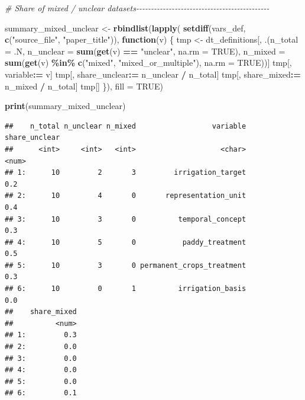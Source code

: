\documentclass[
  11pt,
]{article}
\newenvironment{Shaded}{\begin{snugshade}}{\end{snugshade}}
\newcommand{\AttributeTok}[1]{\textcolor[rgb]{0.13,0.29,0.53}{#1}}
\newcommand{\CommentTok}[1]{\textcolor[rgb]{0.56,0.35,0.01}{\textit{#1}}}
\newcommand{\ConstantTok}[1]{\textcolor[rgb]{0.56,0.35,0.01}{#1}}
\newcommand{\ControlFlowTok}[1]{\textcolor[rgb]{0.13,0.29,0.53}{\textbf{#1}}}
\newcommand{\FunctionTok}[1]{\textcolor[rgb]{0.13,0.29,0.53}{\textbf{#1}}}
\newcommand{\NormalTok}[1]{#1}
\newcommand{\OtherTok}[1]{\textcolor[rgb]{0.56,0.35,0.01}{#1}}
\newcommand{\SpecialCharTok}[1]{\textcolor[rgb]{0.81,0.36,0.00}{\textbf{#1}}}
\newcommand{\StringTok}[1]{\textcolor[rgb]{0.31,0.60,0.02}{#1}}
\begin{document}
\begin{Shaded}
\begin{Highlighting}[]
\CommentTok{\# Share of mixed / unclear datasets{-}{-}{-}{-}{-}{-}{-}{-}{-}{-}{-}{-}{-}{-}{-}{-}{-}{-}{-}{-}{-}{-}{-}{-}{-}{-}{-}{-}{-}{-}{-}{-}{-}{-}{-}{-}{-}{-}{-}{-}{-}{-}{-}{-}{-}}

\NormalTok{summary\_mixed\_unclear }\OtherTok{\textless{}{-}} \FunctionTok{rbindlist}\NormalTok{(}\FunctionTok{lapply}\NormalTok{(}
  \FunctionTok{setdiff}\NormalTok{(vars\_def, }\FunctionTok{c}\NormalTok{(}\StringTok{"source\_file"}\NormalTok{, }\StringTok{"paper\_title"}\NormalTok{)),}
  \ControlFlowTok{function}\NormalTok{(v) \{}
\NormalTok{    tmp }\OtherTok{\textless{}{-}}\NormalTok{ dt\_definitions[, .(}\AttributeTok{n\_total =}\NormalTok{ .N,}
                              \AttributeTok{n\_unclear =} \FunctionTok{sum}\NormalTok{(}\FunctionTok{get}\NormalTok{(v) }\SpecialCharTok{==} \StringTok{"unclear"}\NormalTok{, }\AttributeTok{na.rm =} \ConstantTok{TRUE}\NormalTok{),}
                              \AttributeTok{n\_mixed =} \FunctionTok{sum}\NormalTok{(}\FunctionTok{get}\NormalTok{(v) }\SpecialCharTok{\%in\%} \FunctionTok{c}\NormalTok{(}\StringTok{"mixed"}\NormalTok{, }\StringTok{"mixed\_or\_multiple"}\NormalTok{), }\AttributeTok{na.rm =} \ConstantTok{TRUE}\NormalTok{))]}
\NormalTok{    tmp[, variable}\SpecialCharTok{:=}\NormalTok{ v]}
\NormalTok{    tmp[, share\_unclear}\SpecialCharTok{:=}\NormalTok{ n\_unclear }\SpecialCharTok{/}\NormalTok{ n\_total]}
\NormalTok{    tmp[, share\_mixed}\SpecialCharTok{:=}\NormalTok{ n\_mixed }\SpecialCharTok{/}\NormalTok{ n\_total]}
\NormalTok{    tmp[]}
\NormalTok{  \}), }\AttributeTok{fill =} \ConstantTok{TRUE}\NormalTok{)}

\FunctionTok{print}\NormalTok{(summary\_mixed\_unclear)}
\end{Highlighting}
\end{Shaded}

\begin{verbatim}
##    n_total n_unclear n_mixed                  variable share_unclear
##      <int>     <int>   <int>                    <char>         <num>
## 1:      10         2       3         irrigation_target           0.2
## 2:      10         4       0       representation_unit           0.4
## 3:      10         3       0          temporal_concept           0.3
## 4:      10         5       0           paddy_treatment           0.5
## 5:      10         3       0 permanent_crops_treatment           0.3
## 6:      10         0       1          irrigation_basis           0.0
##    share_mixed
##          <num>
## 1:         0.3
## 2:         0.0
## 3:         0.0
## 4:         0.0
## 5:         0.0
## 6:         0.1
\end{verbatim}
\end{document}
